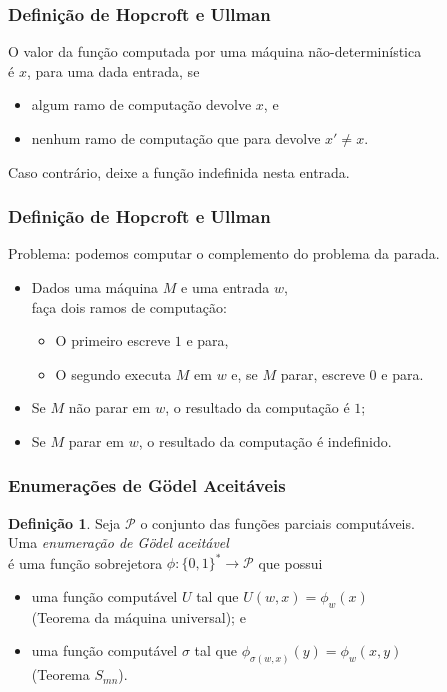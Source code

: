 \documentclass[utf8,notheorems]{beamer}
\theoremstyle{definition}
\newtheorem*{definition}{Definição}
\begin{document}
\begin{frame}
    \frametitle{Definição de Hopcroft e Ullman}
    O valor da função computada por uma máquina não-determinística \\
    é $x$, para uma dada entrada, se
    \begin{itemize}
        \item algum ramo de computação devolve $x$, e
        \item nenhum ramo de computação que para devolve $x' \neq x$.
    \end{itemize}
    Caso contrário, deixe a função indefinida nesta entrada.
    \cite[p.~313]{HopcroftUllman1979}
\end{frame}

\begin{frame}
    \frametitle{Definição de Hopcroft e Ullman}
    Problema: podemos computar o complemento do problema da parada.
    \begin{itemize}
        \item Dados uma máquina $M$ e uma entrada $w$, \\
            faça dois ramos de computação:
            \begin{itemize}
                \item O primeiro escreve $1$ e para,
                \item O segundo executa $M$ em $w$ e, se $M$ parar,
                    escreve $0$ e para.
            \end{itemize}
        \item Se $M$ não parar em $w$,
            o resultado da computação é $1$;
        \item Se $M$ parar em $w$,
            o resultado da computação é indefinido.
    \end{itemize}
\end{frame}

\begin{frame}
    \frametitle{Enumerações de Gödel Aceitáveis}
    \begin{definition}
        Seja $\mathcal P$ o conjunto das funções parciais computáveis. \\
        Uma \emph{enumeração de Gödel aceitável} \\
        é uma função sobrejetora $\phi: \{0, 1\}^* \to \mathcal P$ que possui
        \cite[p.~41]{Rogers1987}
        \begin{itemize}
            \item uma função computável $U$ tal que $U(w, x) = \phi_w(x)$ \\
                (Teorema da máquina universal); e
            \item uma função computável $\sigma$ tal que
                    $\phi_{\sigma(w, x)}(y) = \phi_w(x, y)$ \\
                (Teorema $S_{mn}$).
        \end{itemize}
    \end{definition}
\end{frame}
\end{document}
